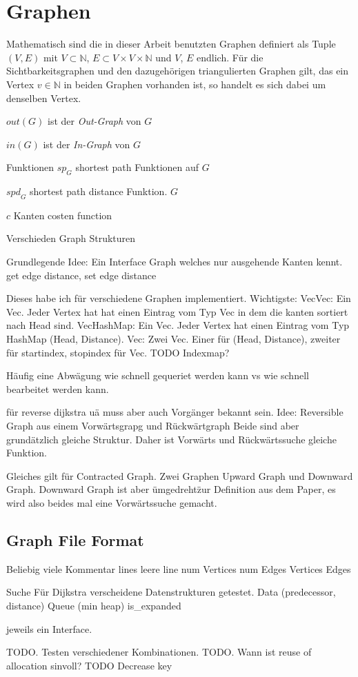 \chapter{Graphen}

Mathematisch sind die in dieser Arbeit benutzten Graphen definiert als Tuple $(V, E)$ mit $V \subset \mathbb{N}$, $E \subset V \times V \times \mathbb{N}$ und $V$, $E$ endlich. Für die Sichtbarkeitsgraphen und den dazugehörigen triangulierten Graphen gilt, das ein Vertex $v \in \mathbb{N}$ in beiden Graphen vorhanden ist, so handelt es sich dabei um denselben Vertex.

${out}(G)$ ist der \emph{Out-Graph} von $G$


${in}(G)$ ist der \emph{In-Graph} von $G$

Funktionen
${sp}_{G}$ shortest path Funktionen auf $G$

${spd}_{G}$ shortest path distance Funktion. $G$

$c$ Kanten costen function

Verschieden Graph Strukturen

Grundlegende Idee:
Ein Interface Graph welches nur ausgehende Kanten kennt.
get edge distance, set edge distance

Dieses habe ich für verschiedene Graphen implementiert.
Wichtigste:
VecVec: Ein Vec. Jeder Vertex hat hat einen Eintrag vom Typ Vec in dem die kanten sortiert nach Head sind.
VecHashMap: Ein Vec. Jeder Vertex hat einen Eintrag vom Typ HashMap (Head, Distance).
Vec: Zwei Vec. Einer für (Head, Distance), zweiter für startindex, stopindex für Vec.
TODO Indexmap?

Häufig eine Abwägung wie schnell gequeriet werden kann vs wie schnell bearbeitet werden kann.


für reverse dijkstra uä muss aber auch Vorgänger bekannt sein.
Idee: Reversible Graph aus einem Vorwärtsgrapg und Rückwärtgraph
Beide sind aber grundätzlich gleiche Struktur. Daher ist Vorwärts und Rückwärtssuche gleiche Funktion.


Gleiches gilt für Contracted Graph. Zwei Graphen Upward Graph und Downward Graph. Downward Graph ist aber \"umgedreht\" zur Definition aus dem Paper, es wird also beides mal eine Vorwärtssuche gemacht.


\section{Graph File Format}
Beliebig viele Kommentar lines
leere line
num Vertices
num Edges
Vertices
Edges

Suche
Für Dijkstra verscheidene Datenstrukturen getestet.
Data (predecessor, distance)
Queue (min heap)
is\_expanded

jeweils ein Interface.

TODO. Testen verschiedener Kombinationen.
TODO. Wann ist reuse of allocation sinvoll?
TODO Decrease key

